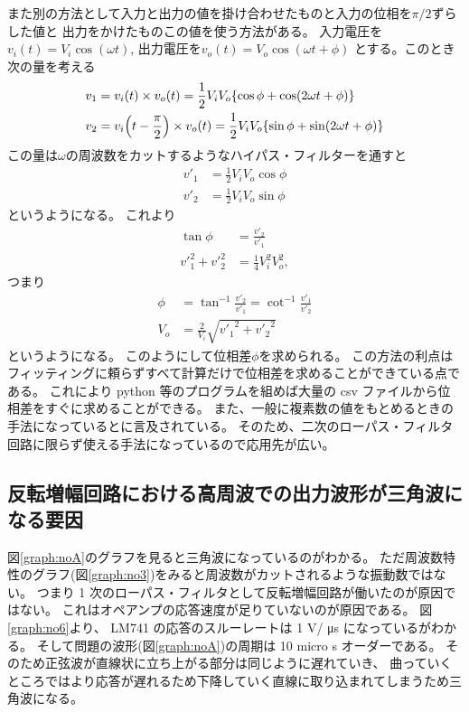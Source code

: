 \documentclass[11pt,dvipdfmx,a4paper]{jsarticle}
\begin{document}
また別の方法として入力と出力の値を掛け合わせたものと入力の位相を\(\pi/2\)ずらした値と
出力をかけたものこの値を使う方法がある\cite{keisoku}。
入力電圧を\(v_i(t) = V_i\cos(\omega t)\),
出力電圧を\(v_o(t) = V_o\cos(\omega t + \phi)\)
とする。このとき次の量を考える
\begin{align}
	v_1 &= v_i(t)\times v_o(t) = \frac{1}{2}V_i V_o \qty{\cos\phi + \cos(2\omega t + \phi)}\\
	v_2 &= v_i\qty(t-\frac{\pi}{2})\times v_o(t) = \frac{1}{2}V_i V_o \qty{\sin\phi + \sin(2\omega t + \phi)}
\end{align}
この量は\(\omega\)の周波数をカットするようなハイパス・フィルターを通すと
\begin{align}
	v'_1 &= \frac{1}{2}V_i V_o \cos\phi\\
	v'_2 &= \frac{1}{2}V_i V_o \sin\phi
\end{align}
というようになる。
これより
\begin{align}
	\tan\phi &= \frac{{v'}_2}{{v'}_1}\\
	{v'}_1^2+{v'}_2^2 &= \frac{1}{4}V_i^2V_o^2,
\end{align}
つまり
\begin{align}
	\phi &= \tan^{-1}\frac{{v'}_2}{{v'}_1} = \cot^{-1}\frac{{v'}_1}{{v'}_2}\\
	V_o &= \frac{2}{V_i}\sqrt{{{v'}_1}^2+{{v'}_2}^2}
\end{align}
というようになる。
このようにして位相差\(\phi\)を求められる。
この方法の利点はフィッティングに頼らずすべて計算だけで位相差を求めることができている点である。
これにより python 等のプログラムを組めば大量の csv ファイルから位相差をすぐに求めることができる。
また、一般に複素数の値をもとめるときの手法になっていると\cite{keisoku}に言及されている。
そのため、二次のローパス・フィルタ回路に限らず使える手法になっているので応用先が広い。


\subsection{反転増幅回路における高周波での出力波形が三角波になる要因}
図\ref{graph:noA}のグラフを見ると三角波になっているのがわかる。
ただ周波数特性のグラフ(図\ref{graph:no3})をみると周波数がカットされるような振動数ではない。
つまり 1 次のローパス・フィルタとして反転増幅回路が働いたのが原因ではない。
これはオペアンプの応答速度が足りていないのが原因である。
図\ref{graph:no6}より、 LM741 の応答のスルーレートは 1 V/ \si{\micro s} になっているがわかる。
そして問題の波形(図\ref{graph:noA})の周期は 10 \si{micro} s オーダーである。
そのため正弦波が直線状に立ち上がる部分は同じように遅れていき、
曲っていくところではより応答が遅れるため下降していく直線に取り込まれてしまうため三角波になる。
\end{document}

